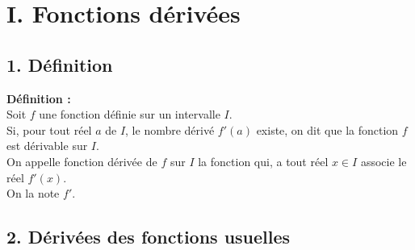 \documentclass[11pt,a4paper]{article}
\title{\titre}
\author{\classe \\ \theme}
\date{}
\begin{document}
\maketitle
\pagestyle{custom}
\thispagestyle{custom}

\section*{I. Fonctions dérivées}
\subsection*{1. Définition}

\begin{mdframed}[style=definitionStyle]
    \textbf{Définition :} ~\\
    Soit $f$ une fonction définie sur un intervalle $I$. \\
    Si, pour tout réel $a$ de $I$, le nombre dérivé $f'(a)$ existe, on dit que la fonction $f$ est dérivable sur $I$. \\
    On appelle fonction dérivée de $f$ sur $I$ la fonction qui, a tout réel $x\in I$ associe le réel $f'(x)$. \\
    On la note $f'$.
\end{mdframed}

\subsection*{2. Dérivées des fonctions usuelles}
\end{document}
